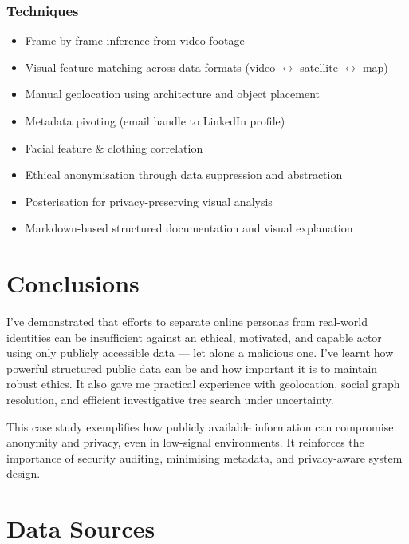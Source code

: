\documentclass[a4paper,11pt]{report}
\begin{document}
\subsection{Techniques}

\begin{itemize}
    \item Frame-by-frame inference from video footage
    \item Visual feature matching across data formats (video $\leftrightarrow$ satellite $\leftrightarrow$ map)
    \item Manual geolocation using architecture and object placement
    \item Metadata pivoting (email handle to LinkedIn profile)
    \item Facial feature \& clothing correlation
    \item Ethical anonymisation through data suppression and abstraction
    \item Posterisation for privacy-preserving visual analysis
    \item Markdown-based structured documentation and visual explanation
\end{itemize}

\chapter{Conclusions}

I've demonstrated that efforts to separate online personas from real-world identities can be insufficient against an ethical, motivated, and capable actor using only publicly accessible data --- let alone a malicious one. I've learnt how powerful structured public data can be and how important it is to maintain robust ethics. It also gave me practical experience with geolocation, social graph resolution, and efficient investigative tree search under uncertainty.

This case study exemplifies how publicly available information can compromise anonymity and privacy, even in low-signal environments. It reinforces the importance of security auditing, minimising metadata, and privacy-aware system design.

\chapter{Data Sources}
\end{document}
